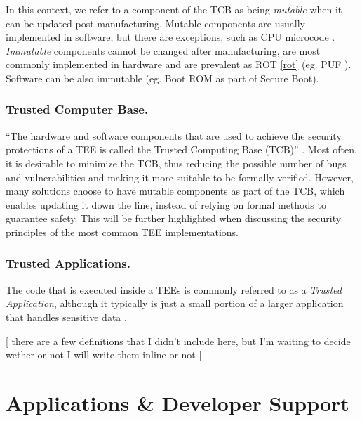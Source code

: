 \documentclass[runningheads,a4paper]{uwsese}
\begin{document}
In this context, we refer to a component of the TCB as being \emph{mutable}
when it can be updated post-manufacturing. Mutable components are usually
implemented in software, but there are exceptions, such as CPU microcode
\cite{microcode_update}. \emph{Immutable} components cannot be changed after
manufacturing, are most commonly implemented in hardware and are prevalent as
ROT \ref{rot} (eg. PUF \cite{tee_base_article}). Software can be also immutable
(eg. Boot ROM as part of Secure Boot).

\subsubsection{Trusted Computer Base.}

``The hardware and software components that are used to achieve the security
protections of a TEE is called the Trusted Computing Base (TCB)''
\cite{tee_hw_sup}. Most often, it is desirable to minimize the TCB, thus
reducing the possible number of bugs and vulnerabilities and making it more
suitable to be formally verified. However, many solutions choose to have
mutable components as part of the TCB, which enables updating it down the line,
instead of relying on formal methods to guarantee safety. This will be further
highlighted when discussing the security principles of the most common TEE
implementations.

\subsubsection{Trusted Applications.}

The code that is executed inside a TEEs is commonly referred to as a
\emph{Trusted Application}, although it typically is just a small portion of a
larger application that handles sensitive data \cite{tee_app_rev}.


[ there are a few definitions that I didn't include here, but I'm waiting to
decide wether or not I will write them inline or not ]


\section{Applications \& Developer Support}
\end{document}
